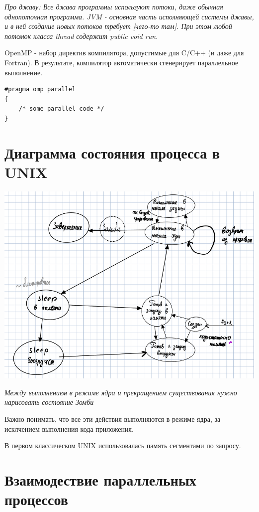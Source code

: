 \documentclass[14pt, a4paper]{article}
\begin{document}
	{\it Про джаву: Все джава программы используют потоки, даже обычная однопоточная программа. JVM - основная часть исполняющей системы джавы, и в ней создание новых потоков требует [чего-то там]. При этом любой потомок класса thread содержит public void run.}
	
	OpenMP - набор директив компилятора, допустимые для C/C++ (и даже для Fortran). В результате, компилятор автоматически сгенерирует параллельное выполнение.

	\begin{lstlisting}
#pragma omp parallel
{
	/* some parallel code */
}
	\end{lstlisting}

	\section*{Диаграмма состояния процесса в UNIX}
	
	\includegraphics[width=\linewidth]{3}
	
	{\it Между выполнением в режиме ядра и прекращением существования нужно нарисовать состояние Зомби}
	
	Важно понимать, что все эти действия выполняются в режиме ядра, за исклчением выполнения кода приложения.
	
	В первом классическом UNIX использовалась память сегментами по запросу.
	
	\section*{Взаимодествие параллельных процессов}
	
\end{document}
